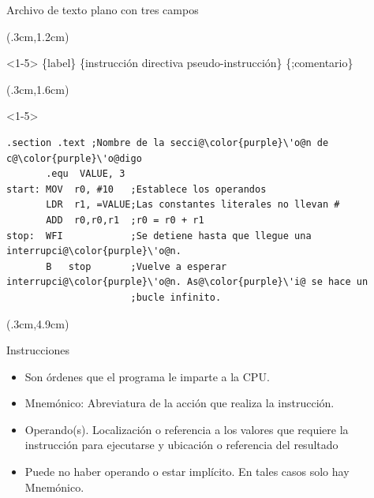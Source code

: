 \documentclass[usenames,table,dvipsnames,aspectratio=169]{beamer}
\begin{document}
\begin{frame}[fragile]{Archivo de texto plano con tres campos}
 \begin{textblock*}{\textwidth}(.3cm,1.2cm)
  \begin{onlyenv}<1-5>
  \{label\} \{instrucción \textbar directiva \textbar pseudo-instrucción\} \{;comentario\}
  \end{onlyenv}
 \end{textblock*}
 \begin{textblock*}{\textwidth}(.3cm,1.6cm)
  \begin{onlyenv}<1-5>
   \begin{lstlisting}[escapechar=\@,]
       .section .text ;Nombre de la secci@\color{purple}\'o@n de c@\color{purple}\'o@digo
       .equ  VALUE, 3     
start: MOV  r0, #10   ;Establece los operandos
       LDR  r1, =VALUE;Las constantes literales no llevan #
       ADD  r0,r0,r1  ;r0 = r0 + r1
stop:  WFI            ;Se detiene hasta que llegue una interrupci@\color{purple}\'o@n.
       B   stop       ;Vuelve a esperar interrupci@\color{purple}\'o@n. As@\color{purple}\'i@ se hace un 
                      ;bucle infinito. 
   \end{lstlisting}
  \end{onlyenv}
 \end{textblock*}
 \begin{textblock*}{\textwidth}(.3cm,4.9cm)   
  \begin{block}{Instrucciones}
   \begin{itemize}[<+(1)->] \justifying
    \item Son órdenes que el programa le imparte a la CPU.
    \item Mnemónico: Abreviatura de la acción que realiza la instrucción.
    \item Operando(s). Localización o referencia a los valores que requiere la instrucción para ejecutarse y ubicación o referencia del resultado
    \item Puede no haber operando o estar implícito. En tales casos solo hay Mnemónico. 
   \end{itemize}
  \end{block}
 \end{textblock*}
\end{frame}
\end{document}
